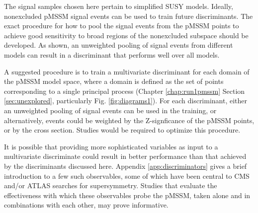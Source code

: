 The signal samples chosen here pertain to simplified SUSY models. Ideally, nonexcluded pMSSM signal events can be used to train future discriminants. The exact procedure for how to pool the signal events from the pMSSM points to achieve good sensitivity to broad regions of the nonexcluded subspace should be developed. As shown, an unweighted pooling of signal events from different models can result in a discriminant that performs well over all models. 

A suggested procedure is to train a multivariate discriminant for each domain of the pMSSM model space, where a domain is defined as the set of points corresponding to a single principal process (Chapter \ref{chap:run1pmssm} Section \ref{sec:unexplored}, particularly Fig. \ref{fig:diagrams1}). For each discriminant, either an unweighted pooling of signal events can be used in the training, or alternatively, events could be weighted by the Z-signficance of the pMSSM points, or by the cross section. Studies would be required to optimize this procedure.

It is possible that providing more sophisticated variables as input to a multivariate discriminate could result in better performance than that achieved by the discriminants discussed here. Appendix \ref{app:discriminators} gives a brief introduction to a few such observables, some of which have been central to CMS and/or ATLAS searches for supersymmetry. Studies that evaluate the effectiveness with which these observables probe the pMSSM, taken alone and in combinations with each other, may prove informative.





